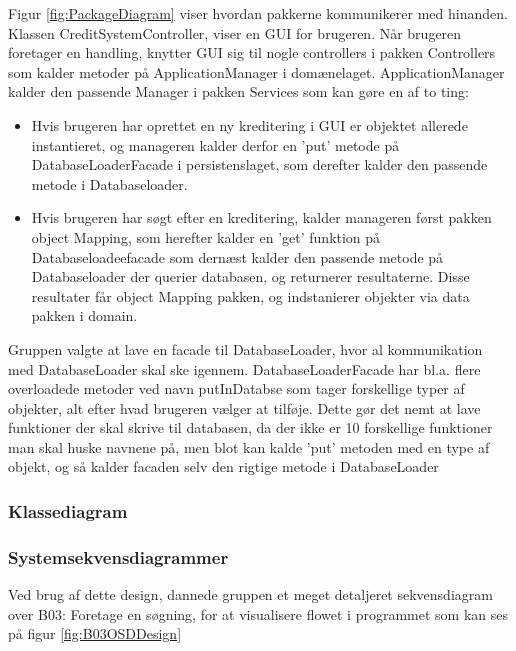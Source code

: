Figur \ref{fig:PackageDiagram} viser hvordan pakkerne kommunikerer med hinanden.
Klassen CreditSystemController, viser en GUI for brugeren. Når brugeren
foretager en handling, knytter GUI sig til nogle controllers i pakken
Controllers som kalder metoder på ApplicationManager i domænelaget.
ApplicationManager kalder den passende Manager i pakken Services som kan gøre en
af to ting: 

\begin{itemize}
    \item Hvis brugeren har oprettet en ny kreditering i GUI er objektet
        allerede instantieret, og manageren kalder derfor en 'put' metode på
        DatabaseLoaderFacade i persistenslaget, som derefter kalder den passende
        metode i Databaseloader. 
    \item Hvis brugeren har søgt efter en kreditering, kalder manageren først
        pakken object Mapping, som herefter kalder en 'get' funktion på
        Databaseloadeefacade som dernæst kalder den passende metode på
        Databaseloader der querier databasen, og returnerer resultaterne. Disse
        resultater får object Mapping pakken, og indstanierer objekter via data
        pakken i domain.
\end{itemize}

Gruppen valgte at lave en facade til DatabaseLoader, hvor al kommunikation med DatabaseLoader skal ske igennem. DatabaseLoaderFacade har bl.a. flere overloadede metoder ved navn putInDatabse som tager forskellige typer af objekter, alt efter hvad brugeren vælger at tilføje. Dette gør det nemt at lave funktioner der skal skrive til databasen, da der ikke er 10 forskellige funktioner man skal huske navnene på, men blot kan kalde 'put' metoden med en type af objekt, og så kalder facaden selv den rigtige metode i DatabaseLoader






\subsubsection{Klassediagram}%
\label{ssub:klassediagram}


\subsubsection{Systemsekvensdiagrammer}%
\label{ssub:systemsekvensdiagrammer}
Ved brug af dette design, dannede gruppen et meget detaljeret sekvensdiagram over B03: Foretage en søgning, for at visualisere flowet i programmet som kan ses på figur \ref{fig:B03OSDDesign}

